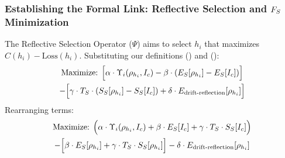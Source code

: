 \subsubsection{Establishing the Formal Link: Reflective Selection and \(F_S\) Minimization}
\label{subsubsec:bk7_establishing_the_formal_link_reflective_selection_and_}
The Reflective Selection Operator ($\Psi$) aims to select \(h_i\) that maximizes \(C(h_i) - \text{Loss}(h_i)\).
Substituting our definitions () and ():
\begin{multline*}
\text{Maximize: } \Big[ \alpha \cdot \Upsilon_i(\rho_{h_i}, I_c) - \beta \cdot (E_S[\rho_{h_i}] - E_S[I_c]) \Big] \\
- \Big[ \gamma \cdot T_S \cdot (S_S[\rho_{h_i}] - S_S[I_c]) + \delta \cdot E_{\text{drift-reflection}}[\rho_{h_i}] \Big]
\end{multline*}
Rearranging terms:
\begin{multline*}
\text{Maximize: } \Big( \alpha \cdot \Upsilon_i(\rho_{h_i}, I_c) + \beta \cdot E_S[I_c] + \gamma \cdot T_S \cdot S_S[I_c] \Big) \\
- \Big[ \beta \cdot E_S[\rho_{h_i}] + \gamma \cdot T_S \cdot S_S[\rho_{h_i}] \Big] - \delta \cdot E_{\text{drift-reflection}}[\rho_{h_i}]
\end{multline*}
